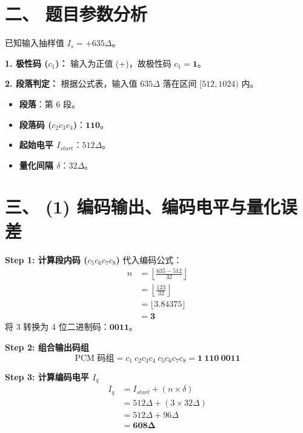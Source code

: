 \documentclass[a4paper,11pt]{ctexart}
\begin{document}
    \section*{二、 题目参数分析}
    
    已知输入抽样值 $I_s = +635\Delta$。
    
    \textbf{1. 极性码 ($c_1$)：}
    输入为正值 ($+$)，故极性码 $c_1 = \mathbf{1}$。
    
    \textbf{2. 段落判定：}
    根据公式表，输入值 $635\Delta$ 落在区间 $[512, 1024)$ 内。
    \begin{itemize}
        \item \textbf{段落}：第 6 段。
        \item \textbf{段落码 ($c_2 c_3 c_4$)}：$\mathbf{110}$。
        \item \textbf{起始电平 $I_{start}$}：$512\Delta$。
        \item \textbf{量化间隔 $\delta$}：$32\Delta$。
    \end{itemize}

    \hrulefill

    \section*{三、 (1) 编码输出、编码电平与量化误差}
    
    \textbf{Step 1: 计算段内码 ($c_5 c_6 c_7 c_8$)}
    代入编码公式：
    \begin{align*}
        n &= \left\lfloor \frac{635 - 512}{32} \right\rfloor \\
          &= \left\lfloor \frac{123}{32} \right\rfloor \\
          &= \lfloor 3.84375 \rfloor \\
          &= \mathbf{3}
    \end{align*}
    将 3 转换为 4 位二进制码：$\mathbf{0011}$。
    
    \textbf{Step 2: 组合输出码组}
    $$ \text{PCM 码组} = c_1 \ c_2 c_3 c_4 \ c_5 c_6 c_7 c_8 = \mathbf{1 \ 110 \ 0011} $$
    
    \textbf{Step 3: 计算编码电平 $I_q$}
    \begin{align*}
        I_q &= I_{start} + (n \times \delta) \\
            &= 512\Delta + (3 \times 32\Delta) \\
            &= 512\Delta + 96\Delta \\
            &= \mathbf{608\Delta}
    \end{align*}
    
\end{document}
